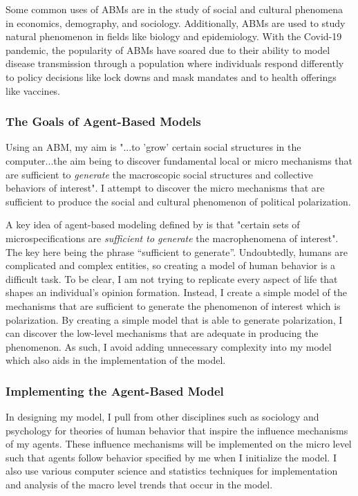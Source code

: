 Some common uses of ABMs are in the study of social and cultural phenomena in economics, demography, and sociology. Additionally, ABMs are used to study natural phenomenon in fields like biology and epidemiology. With the Covid-19 pandemic, the popularity of ABMs have soared due to their ability to model disease transmission through a population where individuals respond differently to policy decisions like lock downs and mask mandates and to health offerings like vaccines. 

\subsubsection{The Goals of Agent-Based Models}

Using an ABM, my aim is "...to 'grow' certain social structures in the computer...the aim being to discover fundamental local or micro mechanisms that are sufficient to \textit{generate} the macroscopic social structures and collective behaviors of interest"\cite{epstein_growing_1996}. I attempt to discover the micro mechanisms that are sufficient to produce the social and cultural phenomenon of political polarization. 

A key idea of agent-based modeling defined by \cite{epstein_growing_1996} is that "certain sets of microspecifications are \textit{sufficient to generate} the macrophenomena of interest". The key here being the phrase ``sufficient to generate''. Undoubtedly, humans are complicated and complex entities, so creating a model of human behavior is a difficult task. To be clear, I am not trying to replicate every aspect of life that shapes an individual's opinion formation. Instead, I create a simple model of the mechanisms that are sufficient to generate the phenomenon of interest which is polarization. By creating a simple model that is able to generate polarization, I can discover the low-level mechanisms that are adequate in producing the phenomenon. As such, I avoid adding unnecessary complexity into my model which also aids in the implementation of the model.   

\subsubsection{Implementing the Agent-Based Model}

In designing my model, I pull from other disciplines such as sociology and psychology for theories of human behavior that inspire the influence mechanisms of my agents. These influence mechanisms will be implemented on the micro level such that agents follow behavior specified by me when I initialize the model. I also use various computer science and statistics techniques for implementation and analysis of the macro level trends that occur in the model.    

